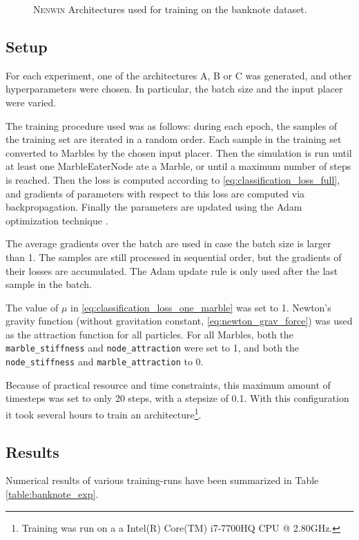 \begin{figure}
	\caption{\textsc{Nenwin} Architectures used for training on the banknote dataset.}
	\label{fig:banknote_architectures}
\end{figure}

\subsection{Setup}
For each experiment, one of the architectures A, B or C was generated, and other hyperparameters were chosen.
In particular, the batch size and the input placer were varied. 

The training procedure used was as follows:
during each epoch, the samples of the training set are iterated in a random order. 
Each sample in the training set converted to Marbles by the chosen input placer.
Then the simulation is run until at least one MarbleEaterNode ate a Marble, 
or until a maximum number of steps is reached. 
Then the loss is computed according to \eqref{eq:classification_loss_full},
and gradients of parameters with respect to this loss are computed via backpropagation.
Finally the parameters are updated using the Adam optimization technique \cite{adam}.

The average gradients over the batch are used in case the batch size is larger than 1. 
The samples are still processed in sequential order, but the gradients of their losses are accumulated.
The Adam update rule is only used after the last sample in the batch.

The value of $\mu$ in \eqref{eq:classification_loss_one_marble} was set to 1. 
Newton's gravity function (without gravitation constant, 
\eqref{eq:newton_grav_force}) was used as the attraction function for all particles. 
For all Marbles, 
both the \texttt{marble\_stiffness} and \texttt{node\_attraction} were set to 1,
and both the \texttt{node\_stiffness} and \texttt{marble\_attraction} to 0. 



Because of practical resource and time constraints, this maximum amount of timesteps was set to only 20 steps, with a stepsize of 0.1. 
With this configuration it took several hours to train an architecture\footnote{Training was run on a a Intel(R) Core(TM) i7-7700HQ CPU @ 2.80GHz.}. 

\subsection{Results}

Numerical results of various training-runs have been summarized in Table \ref{table:banknote_exp}. 


